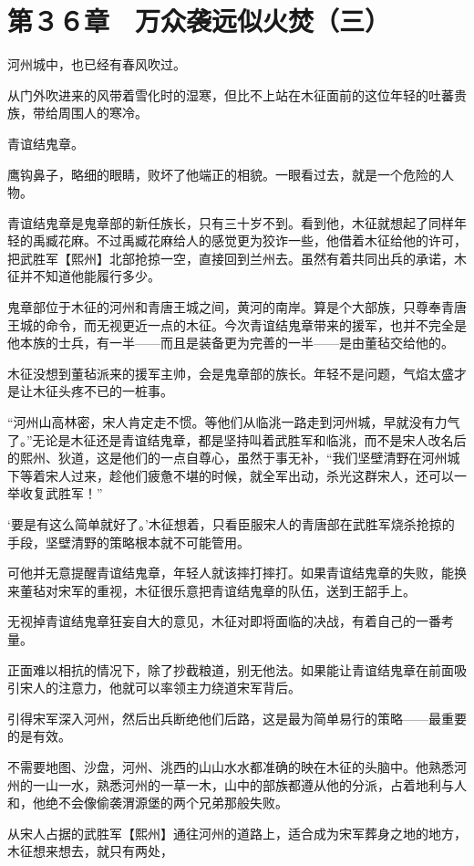 \section{第３６章　万众袭远似火焚（三）}

河州城中，也已经有春风吹过。

从门外吹进来的风带着雪化时的湿寒，但比不上站在木征面前的这位年轻的吐蕃贵族，带给周围人的寒冷。

青谊结鬼章。

鹰钩鼻子，略细的眼睛，败坏了他端正的相貌。一眼看过去，就是一个危险的人物。

青谊结鬼章是鬼章部的新任族长，只有三十岁不到。看到他，木征就想起了同样年轻的禹臧花麻。不过禹臧花麻给人的感觉更为狡诈一些，他借着木征给他的许可，把武胜军【熙州】北部抢掠一空，直接回到兰州去。虽然有着共同出兵的承诺，木征并不知道他能履行多少。

鬼章部位于木征的河州和青唐王城之间，黄河的南岸。算是个大部族，只尊奉青唐王城的命令，而无视更近一点的木征。今次青谊结鬼章带来的援军，也并不完全是他本族的士兵，有一半——而且是装备更为完善的一半——是由董毡交给他的。

木征没想到董毡派来的援军主帅，会是鬼章部的族长。年轻不是问题，气焰太盛才是让木征头疼不已的一桩事。

“河州山高林密，宋人肯定走不惯。等他们从临洮一路走到河州城，早就没有力气了。”无论是木征还是青谊结鬼章，都是坚持叫着武胜军和临洮，而不是宋人改名后的熙州、狄道，这是他们的一点自尊心，虽然于事无补，“我们坚壁清野在河州城下等着宋人过来，趁他们疲惫不堪的时候，就全军出动，杀光这群宋人，还可以一举收复武胜军！”

‘要是有这么简单就好了。’木征想着，只看臣服宋人的青唐部在武胜军烧杀抢掠的手段，坚壁清野的策略根本就不可能管用。

可他并无意提醒青谊结鬼章，年轻人就该摔打摔打。如果青谊结鬼章的失败，能换来董毡对宋军的重视，木征很乐意把青谊结鬼章的队伍，送到王韶手上。

无视掉青谊结鬼章狂妄自大的意见，木征对即将面临的决战，有着自己的一番考量。

正面难以相抗的情况下，除了抄截粮道，别无他法。如果能让青谊结鬼章在前面吸引宋人的注意力，他就可以率领主力绕道宋军背后。

引得宋军深入河州，然后出兵断绝他们后路，这是最为简单易行的策略——最重要的是有效。

不需要地图、沙盘，河州、洮西的山山水水都准确的映在木征的头脑中。他熟悉河州的一山一水，熟悉河州的一草一木，山中的部族都遵从他的分派，占着地利与人和，他绝不会像偷袭渭源堡的两个兄弟那般失败。

从宋人占据的武胜军【熙州】通往河州的道路上，适合成为宋军葬身之地的地方，木征想来想去，就只有两处，

